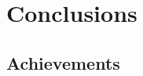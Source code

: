 
\chapter{Conclusions}
\label{chapter:conclusions}

\section{Achievements}
\label{section:achievements}

